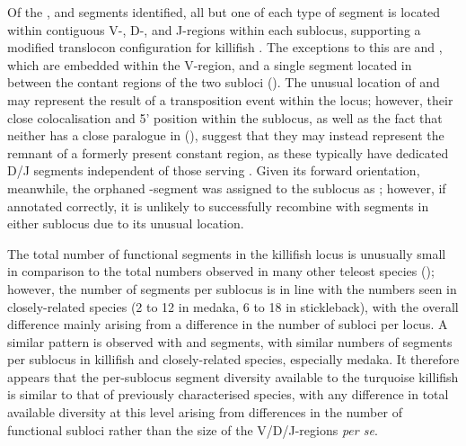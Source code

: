 Of the \vh, \dh and \jh segments identified, all but one of each type of segment is located within contiguous V-, D-, and J-regions within each sublocus, supporting a modified translocon configuration for killifish \igh. The exceptions to this are  and , which are embedded within the  V-region, and a single \vh segment located in between the  contant regions of the two subloci (). The unusual location of  and  may represent the result of a transposition event within the \igh{} locus; however, their close colocalisation and 5' position within the  sublocus, as well as the fact that neither has a close paralogue in  (), suggest that they may instead represent the remnant of a formerly present  constant region, as these typically have dedicated D/J segments independent of those serving . Given its forward orientation, meanwhile, the orphaned \vh-segment was assigned to the  sublocus as ; however, if annotated correctly, it is unlikely to successfully recombine with segments in either sublocus due to its unusual location.
		
The total number of functional \vh segments in the killifish locus is unusually small in comparison to the total numbers observed in many other teleost species (); however, the number of segments per sublocus is in line with the numbers seen in closely-related species (2 to 12 in medaka, 6 to 18 in stickleback), with the overall difference mainly arising from a difference in the number of subloci per locus. A similar pattern is observed with \dh and \jh segments, with similar numbers of segments per sublocus in killifish and closely-related species, especially medaka. It therefore appears that the per-sublocus segment diversity available to the turquoise killifish is similar to that of previously characterised species, with any difference in total available diversity at this level arising from differences in the number of functional subloci rather than the size of the V/D/J-regions \textit{per se}.

